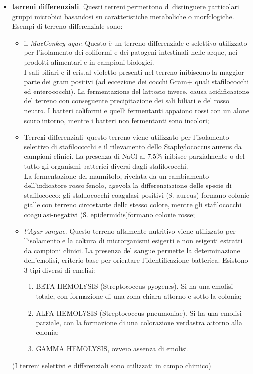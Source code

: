 \documentclass[11pt]{book}
\begin{document}
\begin{itemize}
\item \textbf{terreni differenziali}. Questi terreni permettono di distinguere particolari gruppi microbici basandosi su caratteristiche metaboliche o morfologiche.\\
Esempi di terreno differenziale sono:
\begin{itemize}
\item il \emph{MacConkey agar}. Questo è un terreno differenziale e selettivo utilizzato per l’isolamento dei coliformi e dei patogeni intestinali nelle acque, nei prodotti alimentari e in campioni biologici.\\
I sali biliari e il cristal violetto presenti nel terreno inibiscono la maggior parte dei gram positivi (ad eccezione dei cocchi Gram+ quali stafilococchi ed enterococchi). La fermentazione del lattosio invece, causa
acidificazione del terreno con conseguente precipitazione dei sali biliari e del rosso neutro. I batteri coliformi e quelli fermentanti appaiono rossi con un alone scuro intorno, mentre i batteri non fermentanti sono incolori;
\item Terreni differenziali: questo terreno viene utilizzato per l'isolamento selettivo di stafilococchi e il rilevamento dello Staphylococcus aureus da campioni clinici. La presenza di NaCl al 7,5$\%$ inibisce parzialmente o del tutto gli organismi batterici diversi dagli stafilococchi.\\
La fermentazione del mannitolo, rivelata da un cambiamento dell'indicatore rosso fenolo, agevola la differenziazione delle specie di stafilococco: gli stafilococchi coagulasi-positivi (S. aureus) formano colonie gialle con terreno circostante dello stesso colore, mentre gli stafilococchi coagulasi-negativi (S. epidermidis)formano colonie rosse;
\item \emph{l'Agar sangue}. Questo terreno altamente nutritivo viene utilizzato per l'isolamento e la coltura di microrganismi esigenti e non esigenti estratti da campioni clinici. La presenza del sangue permette la determinazione dell’emolisi, criterio base per orientare l’identificazione batterica. Esistono 3 tipi diversi di emolisi:
\begin{enumerate}
\item BETA HEMOLYSIS (Streptococcus pyogenes). Si ha una emolisi totale, con formazione di una zona chiara attorno e sotto la colonia;
\item ALFA HEMOLYSIS (Streptococcus pneumoniae). Si ha una emolisi parziale, con la formazione di una colorazione verdastra attorno alla colonia;
\item GAMMA HEMOLYSIS, ovvero assenza di emolisi.
\end{enumerate}
\end{itemize}

(I terreni selettivi e differenziali sono utilizzati in campo chimico)
\end{itemize}
\end{document}
